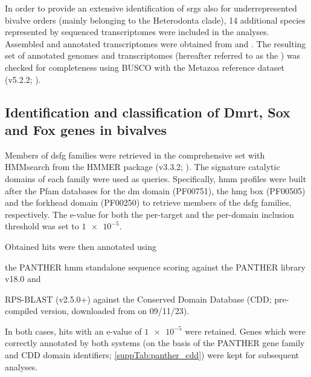 In order to provide an extensive identification of \glspl{srg} also for underrepresented bivalve orders (mainly belonging to the Heterodonta clade), 14 additional species represented by sequenced transcriptomes were included in the analyses. Assembled and annotated transcriptomes were obtained from  and .
The resulting set of annotated genomes and transcriptomes (hereafter referred to as the ) was checked for completeness using BUSCO with the Metazoa reference dataset (v5.2.2; ).

\subsection{Identification and classification of Dmrt, Sox and Fox genes in bivalves}
Members of \gls{dsfg} families were retrieved in the comprehensive set with HMMsearch from the HMMER package (v3.3.2; ). The signature catalytic domains of each family were used as queries. Specifically, \gls{hmm} profiles were built after the Pfam databases for the \gls{dm} domain (PF00751), the \gls{hmg} box (PF00505) and the forkhead domain (PF00250) to retrieve members of the \gls{dsfg} families, respectively. The e-value for both the per-target and the per-domain inclusion threshold was set to $\num{1e-5}$.

Obtained hits were then annotated using
\begin{inlinelist}
	\item the PANTHER \gls{hmm} standalone sequence scoring against the PANTHER library v18.0 and
	\item RPS-BLAST (v2.5.0+) against the Conserved Domain Database (CDD; pre-compiled version, downloaded from  on 09/11/23).	
\end{inlinelist}
In both cases, hits with an e-value of $\num{1e-5}$ were retained. Genes which were correctly annotated by both systems (on the basis of the PANTHER gene family and CDD domain identifiers; \cref{suppTab:panther_cdd}) were kept for subsequent analyses.

